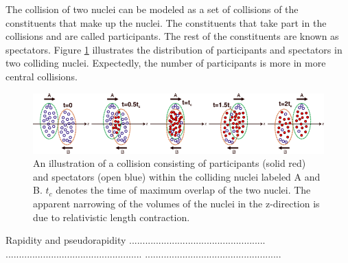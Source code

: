 The collision of two nuclei can be modeled as a set of collisions of the constituents that make up the nuclei. The constituents that take part in the collisions and are called participants. The rest of the constituents are known as spectators. Figure \ref{fig:part_spec} illustrates the distribution of participants and spectators in two colliding nuclei. Expectedly, the number of participants is more in more central collisions.
\begin{figure}[h]
  \centering
  \includegraphics[width=6.5in]{figures/part_spec_Vovchenko.png}
  \caption{An illustration of a collision consisting of participants (solid red) and spectators (open blue) within the colliding nuclei labeled A and B. $t_{c}$ denotes the time of maximum overlap of the two nuclei. The apparent narrowing of the volumes of the nuclei in the z-direction is due to relativistic length contraction. \cite{PhysRevC.90.044907}}\label{fig:part_spec}
\end{figure}


Rapidity and pseudorapidity
...................................................
...................................................
...................................................


